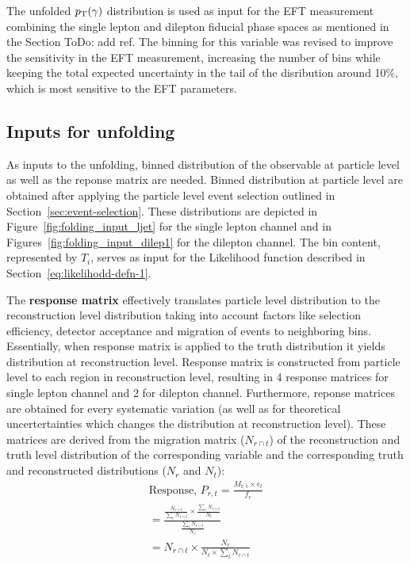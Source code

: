 The unfolded $p_{\text{T}}(\gamma)$ distribution is used as input for the EFT measurement combining the single lepton and dilepton fiducial phase spaces as mentioned in the Section {ToDo: add ref}. The binning for this variable was revised to improve the sensitivity in the EFT measurement, increasing the number of bins while keeping the total expected uncertainty in the tail of the disribution around 10\%, which is most sensitive to the EFT parameters.  



\subsection{Inputs for unfolding}
\label{sec:inputs-for-unfolding}
As inputs to the unfolding, binned distribution of the observable at particle level as well as the reponse matrix are needed. Binned distribution at particle level are obtained after applying the particle level event selection outlined in Section~\ref{sec:event-selection}. These distributions are depicted in Figure~\ref{fig:folding_input_ljet} for the single lepton channel and in Figures~\ref{fig:folding_input_dilep1} for the dilepton channel. The bin content, represented by $T_{i}$, serves as input for the Likelihood function described in Section~\ref{eq:likelihodd-defn-1}.

The \textbf{response matrix} effectively translates particle level distribution to the reconstruction level distribution taking into account factors like selection efficiency, detector acceptance and migration of events to neighboring bins. Essentially, when response matrix is applied to the truth distribution it yields distribution at reconstruction level. Response matrix is constructed from particle level to each region in reconstruction level, resulting in 4 response matrices for single lepton channel and 2 for dilepton channel. Furthermore, reponse matrices are obtained for every systematic variation (as well as for theoretical uncertertainties which changes the distribution at reconstruction level). These matrices are derived from the migration matrix ($N_{r \cap t}$) of the reconstruction and truth level distribution of the corresponding variable and the corresponding truth and reconstructed distributions ($N_{r}$ and $N_{t}$):
\begin{align}
    \text{Response, } P_{r,t} = \frac{M_{\mathrm{r,t}} \times \epsilon_{t}}{f_{r}}\\
    = \frac{\frac{N_{r \cap t}}{\sum_{r} N_{r \cap t}} \times \frac{\sum_{r} N_{r \cap t}}{N_{t}}}{\frac{\sum_{t} N_{r \cap t}}{N_{r}}}\\
    = N_{r \cap t} \times \frac{N_{r}}{N_{t}\times \sum_{t} N_{r \cap t}}
\end{align}

